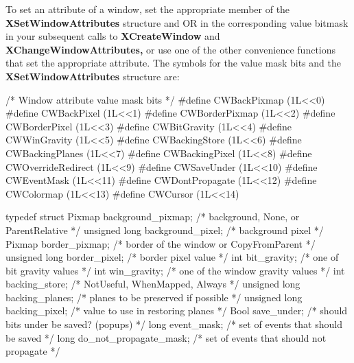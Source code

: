 \documentclass{report}
\begin{document}
\begin{itemize}
            \bigbreak \noindent 
            To set an attribute of a window, set the appropriate member of the \textbf{XSetWindowAttributes} structure and OR in the corresponding value bitmask in your subsequent calls to \textbf{XCreateWindow} and \textbf{XChangeWindowAttributes,} or use one of the other convenience functions that set the appropriate attribute. The symbols for the value mask bits and the \textbf{XSetWindowAttributes} structure are:
            \bigbreak \noindent 
            \begin{cppcode}
                /* Window attribute value mask bits */
                #define CWBackPixmap        (1L<<0)
                #define CWBackPixel         (1L<<1)
                #define CWBorderPixmap      (1L<<2)
                #define CWBorderPixel       (1L<<3)
                #define CWBitGravity        (1L<<4)
                #define CWWinGravity        (1L<<5)
                #define CWBackingStore      (1L<<6)
                #define CWBackingPlanes     (1L<<7)
                #define CWBackingPixel      (1L<<8)
                #define CWOverrideRedirect  (1L<<9)
                #define CWSaveUnder         (1L<<10)
                #define CWEventMask         (1L<<11)
                #define CWDontPropagate     (1L<<12)
                #define CWColormap          (1L<<13)
                #define CWCursor            (1L<<14)
            \end{cppcode}
            \bigbreak \noindent 
            \begin{cppcode}
                typedef struct {
                    Pixmap background_pixmap;       /* background, None, or ParentRelative */
                    unsigned long background_pixel; /* background pixel */
                    Pixmap border_pixmap;           /* border of the window or CopyFromParent */
                    unsigned long border_pixel;     /* border pixel value */
                    int bit_gravity;                /* one of bit gravity values */
                    int win_gravity;                /* one of the window gravity values */
                    int backing_store;              /* NotUseful, WhenMapped, Always */
                    unsigned long backing_planes;   /* planes to be preserved if possible */
                    unsigned long backing_pixel;    /* value to use in restoring planes */
                    Bool save_under;                /* should bits under be saved? (popups) */
                    long event_mask;                /* set of events that should be saved */
                    long do_not_propagate_mask;     /* set of events that should not propagate */
}
\end{cppcode}
\end{itemize}
\end{document}
